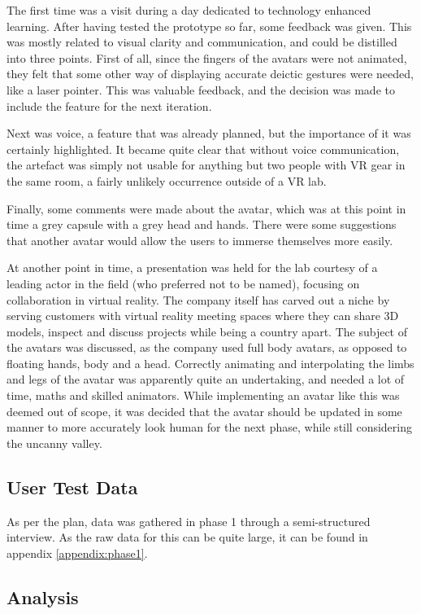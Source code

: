 The first time was a visit during a day dedicated to technology enhanced learning. After having tested the prototype so far, some feedback was given. This was mostly related to visual clarity and communication, and could be distilled into three points. First of all, since the fingers of the avatars were not animated, they felt that some other way of displaying accurate deictic gestures were needed, like a laser pointer. This was valuable feedback, and the decision was made to include the feature for the next iteration. 

Next was voice, a feature that was already planned, but the importance of it was certainly highlighted. It became quite clear that without voice communication, the artefact was simply not usable for anything but two people with VR gear in the same room, a fairly unlikely occurrence outside of a VR lab.

Finally, some comments were made about the avatar, which was at this point in time a grey capsule with a grey head and hands. There were some suggestions that another avatar would allow the users to immerse themselves more easily. 

At another point in time, a presentation was held for the lab courtesy of a leading actor in the field (who preferred not to be named), focusing on collaboration in virtual reality. The company itself has carved out a niche by serving customers with virtual reality meeting spaces where they can share 3D models, inspect and discuss projects while being a country apart. The subject of the avatars was discussed, as the company used full body avatars, as opposed to floating hands, body and a head. Correctly animating and interpolating the limbs and legs of the avatar was apparently quite an undertaking, and needed a lot of time, maths and skilled animators. While implementing an avatar like this was deemed out of scope, it was decided that the avatar should be updated in some manner to more accurately look human for the next phase, while still considering the uncanny valley. 



\subsection{User Test Data}
As per the plan, data was gathered in phase 1 through a semi-structured interview. As the raw data for this can be quite large, it can be found in appendix \ref{appendix:phase1}.


\subsection{Analysis}
\label{section:phase1Analysis}
